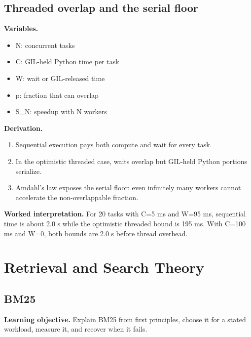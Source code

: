 \subsection{Threaded overlap and the serial floor}
\textbf{Variables.}\begin{itemize}
\item N: concurrent tasks
\item C: GIL-held Python time per task
\item W: wait or GIL-released time
\item p: fraction that can overlap
\item S\_N: speedup with N workers
\end{itemize}
\textbf{Derivation.}\begin{derivation}\begin{enumerate}
\item Sequential execution pays both compute and wait for every task.
\item In the optimistic threaded case, waits overlap but GIL-held Python portions serialize.
\item Amdahl's law exposes the serial floor: even infinitely many workers cannot accelerate the non-overlappable fraction.
\end{enumerate}\end{derivation}
\textbf{Worked interpretation.} For 20 tasks with C=5 ms and W=95 ms, sequential time is about 2.0 s while the optimistic threaded bound is 195 ms. With C=100 ms and W=0, both bounds are 2.0 s before thread overhead.
\clearpage\section{Retrieval and Search Theory}
\subsection{BM25}
\textbf{Learning objective.} Explain BM25 from first principles, choose it for a stated workload, measure it, and recover when it fails.
